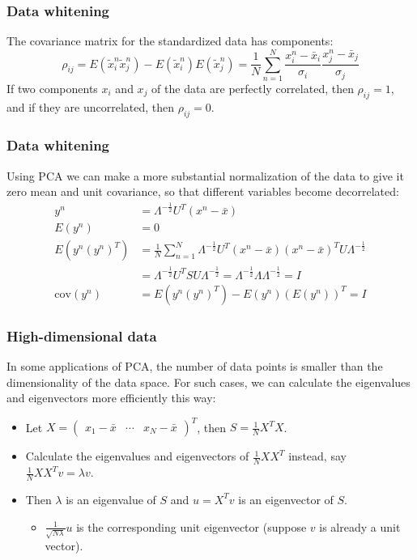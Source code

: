 \documentclass{beamer}
\begin{document}
\begin{frame}
    \frametitle{Data whitening}
    The covariance matrix for the standardized data has components:
    \begin{equation*}
        \rho_{ij}=E(\tilde{x}^{n}_{i}\tilde{x}^{n}_{j})-E(\tilde{x}^{n}_{i})E(\tilde{x}^{n}_{j})=\frac{1}{N}\sum_{n=1}^{N}\frac{x^{n}_{i}-\bar{x}_{i}}{\sigma_{i}}\frac{x^{n}_{j}-\bar{x}_{j}}{\sigma_{j}}
    \end{equation*}
    If two components $x_{i}$ and $x_{j}$ of the data are perfectly correlated, then $\rho_{ij}=1$, and if they are uncorrelated, then $\rho_{ij}=0$.
\end{frame}

\begin{frame}
    \frametitle{Data whitening}
    Using PCA we can make a more substantial normalization of the data to give it zero mean and unit covariance, so that different variables become decorrelated:
    \begin{align*}
        y^{n}&=\Lambda^{-\frac{1}{2}}U^{T}(x^{n}-\bar{x}) \\
        E(y^{n})&=0 \\
        E(y^{n}(y^{n})^{T})&=\frac{1}{N}\sum_{n=1}^{N}\Lambda^{-\frac{1}{2}}U^{T}(x^{n}-\bar{x})(x^{n}-\bar{x})^{T}U\Lambda^{-\frac{1}{2}} \\
        &=\Lambda^{-\frac{1}{2}}U^{T}SU\Lambda^{-\frac{1}{2}}=\Lambda^{-\frac{1}{2}}\Lambda\Lambda^{-\frac{1}{2}}=I \\
        \mathrm{cov}(y^{n})&=E(y^{n}(y^{n})^{T})-E(y^{n})(E(y^{n}))^{T}=I
    \end{align*}
\end{frame}

\begin{frame}
    \frametitle{High-dimensional data}
    In some applications of PCA, the number of data points is smaller than the dimensionality of the data space. For such cases, we can calculate the eigenvalues and eigenvectors more efficiently this way:
    \begin{itemize}
        \item Let $X=\begin{pmatrix}
            x_{1}-\bar{x}&\cdots&x_{N}-\bar{x}
        \end{pmatrix}^{T}$, then $S=\frac{1}{N}X^{T}X$.
        \item Calculate the eigenvalues and eigenvectors of $\frac{1}{N}XX^{T}$ instead, say $\frac{1}{N}XX^{T}v=\lambda{}v$.
        \item Then $\lambda$ is an eigenvalue of $S$ and $u=X^{T}v$ is an eigenvector of $S$.
        \begin{itemize}
            \item $\frac{1}{\sqrt{N\lambda}}u$ is the corresponding unit eigenvector (suppose $v$ is already a unit vector).
        \end{itemize}
    \end{itemize}
\end{frame}
\end{document}
